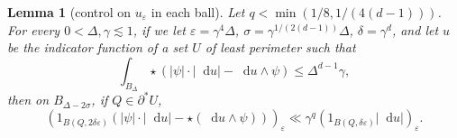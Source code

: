 \documentclass[reqno,12pt,letterpaper]{amsart}
\newcommand*\dif{\mathop{}\!\mathrm{d}}
\newtheorem{lemma}[theorem]{Lemma}
\theoremstyle{definition}
\numberwithin{equation}{section}
\begin{document}
\begin{lemma}[control on $u_\varepsilon$ in each ball]\label{mollifier sublemma}
Let $q < \min(1/8, 1/(4(d - 1)))$.
For every $0 < \Delta, \gamma \lesssim 1$, if we let $\varepsilon = \gamma^4 \Delta$, $\sigma = \gamma^{1/(2(d - 1))} \Delta$, $\delta = \gamma^d$, and let $u$ be the indicator function of a set $U$ of least perimeter such that
\begin{equation}\label{hypothesis on mollifier sublemma}
\int_{B_\Delta} \star(|\psi| \cdot |\dif u| - \dif u \wedge \psi) \leq \Delta^{d - 1} \gamma,
\end{equation}
then on $B_{\Delta - 2\sigma}$, if $Q \in \partial^* U$,
$$(1_{B(Q, 2\delta\varepsilon)}(|\psi| \cdot |\dif u| - \star(\dif u \wedge \psi)))_\varepsilon \ll \gamma^q (1_{B(Q, \delta\varepsilon)} |\dif u|)_\varepsilon.$$
\end{lemma}
\end{document}
